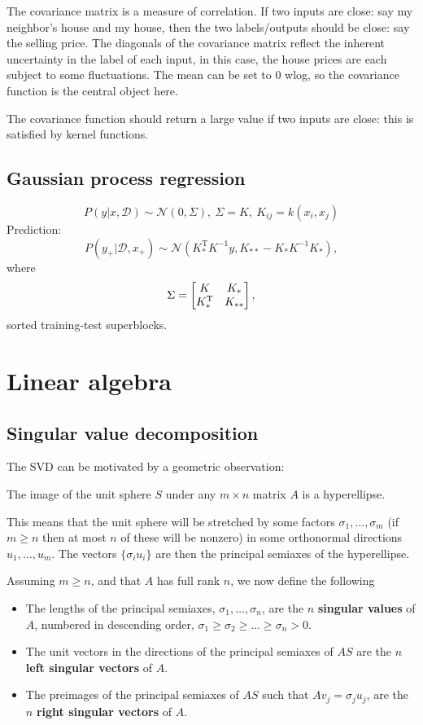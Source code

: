 \documentclass{article}
\begin{document}
The covariance matrix is a measure of correlation. If two inputs are close: say my neighbor's house and my house, then the two labels/outputs should be close: say the selling price. The diagonals of the covariance matrix reflect the inherent uncertainty in the label of each input, in this case, the house prices are each subject to some fluctuations. The mean can be set to $0$ wlog, so the covariance function is the central object here.

The covariance function should return a large value if two inputs are close: this is satisfied by kernel functions.

\subsection{Gaussian process regression}
\begin{equation}
P(y|x,\mathcal{D})\sim\mathcal{N}(0,\Sigma),\ \Sigma=K,\ K_{ij}=k(x_i,x_j)
\end{equation}
Prediction:
\begin{equation}
    P(y_+|\mathcal{D},x_+)\sim\mathcal{N}(K_*^{\mathrm{T}}K^{-1}y,K_{**}-K_*K^{-1}K_*),
\end{equation}
where
\begin{equation}
    \Sigma=\begin{bmatrix}{K}&{K_*}\\{K_*^{\mathrm{T}}}&{K_{**}}\end{bmatrix},
\end{equation}
sorted training-test superblocks.

\section{Linear algebra}
\subsection{Singular value decomposition}
The SVD can be motivated by a geometric observation:
\begin{theorem}
    The image of the unit sphere $S$ under any $m\times n$ matrix $A$ is a hyperellipse. 
\end{theorem}
This means that the unit sphere will be stretched by some factors $\sigma_1,\dots,\sigma_m$ (if $m\geq n$ then at most $n$ of these will be nonzero) in some orthonormal directions $u_1,\dots,u_m$. The vectors $\{ \sigma_iu_i \}$ are then the principal semiaxes of the hyperellipse.
\begin{definition}
    Assuming $m\geq n$, and that $A$ has full rank $n$, we now define the following
    \begin{itemize}
        \item The lengths of the principal semiaxes, $\sigma_1,\dots,\sigma_n$, are the $n$ \textbf{singular values} of $A$, numbered in descending order, $\sigma_1\geq\sigma_2\geq\dots\geq\sigma_n>0$.
        \item The unit vectors in the directions of the principal semiaxes of $AS$ are the $n$ \textbf{left singular vectors} of $A$.
        \item The preimages of the principal semiaxes of $AS$ such that $Av_j=\sigma_ju_j$, are the $n$ \textbf{right singular vectors} of $A$.
    \end{itemize}
\end{definition}
\end{document}
